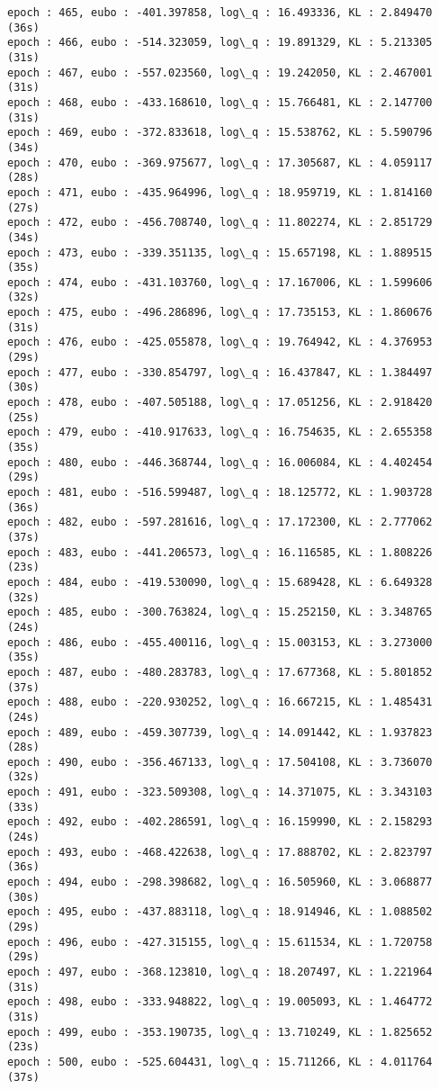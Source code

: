 \documentclass[11pt]{article}
\begin{document}
\begin{Verbatim}[commandchars=\\\{\}]
epoch : 465, eubo : -401.397858, log\_q : 16.493336, KL : 2.849470 (36s)
epoch : 466, eubo : -514.323059, log\_q : 19.891329, KL : 5.213305 (31s)
epoch : 467, eubo : -557.023560, log\_q : 19.242050, KL : 2.467001 (31s)
epoch : 468, eubo : -433.168610, log\_q : 15.766481, KL : 2.147700 (31s)
epoch : 469, eubo : -372.833618, log\_q : 15.538762, KL : 5.590796 (34s)
epoch : 470, eubo : -369.975677, log\_q : 17.305687, KL : 4.059117 (28s)
epoch : 471, eubo : -435.964996, log\_q : 18.959719, KL : 1.814160 (27s)
epoch : 472, eubo : -456.708740, log\_q : 11.802274, KL : 2.851729 (34s)
epoch : 473, eubo : -339.351135, log\_q : 15.657198, KL : 1.889515 (35s)
epoch : 474, eubo : -431.103760, log\_q : 17.167006, KL : 1.599606 (32s)
epoch : 475, eubo : -496.286896, log\_q : 17.735153, KL : 1.860676 (31s)
epoch : 476, eubo : -425.055878, log\_q : 19.764942, KL : 4.376953 (29s)
epoch : 477, eubo : -330.854797, log\_q : 16.437847, KL : 1.384497 (30s)
epoch : 478, eubo : -407.505188, log\_q : 17.051256, KL : 2.918420 (25s)
epoch : 479, eubo : -410.917633, log\_q : 16.754635, KL : 2.655358 (35s)
epoch : 480, eubo : -446.368744, log\_q : 16.006084, KL : 4.402454 (29s)
epoch : 481, eubo : -516.599487, log\_q : 18.125772, KL : 1.903728 (36s)
epoch : 482, eubo : -597.281616, log\_q : 17.172300, KL : 2.777062 (37s)
epoch : 483, eubo : -441.206573, log\_q : 16.116585, KL : 1.808226 (23s)
epoch : 484, eubo : -419.530090, log\_q : 15.689428, KL : 6.649328 (32s)
epoch : 485, eubo : -300.763824, log\_q : 15.252150, KL : 3.348765 (24s)
epoch : 486, eubo : -455.400116, log\_q : 15.003153, KL : 3.273000 (35s)
epoch : 487, eubo : -480.283783, log\_q : 17.677368, KL : 5.801852 (37s)
epoch : 488, eubo : -220.930252, log\_q : 16.667215, KL : 1.485431 (24s)
epoch : 489, eubo : -459.307739, log\_q : 14.091442, KL : 1.937823 (28s)
epoch : 490, eubo : -356.467133, log\_q : 17.504108, KL : 3.736070 (32s)
epoch : 491, eubo : -323.509308, log\_q : 14.371075, KL : 3.343103 (33s)
epoch : 492, eubo : -402.286591, log\_q : 16.159990, KL : 2.158293 (24s)
epoch : 493, eubo : -468.422638, log\_q : 17.888702, KL : 2.823797 (36s)
epoch : 494, eubo : -298.398682, log\_q : 16.505960, KL : 3.068877 (30s)
epoch : 495, eubo : -437.883118, log\_q : 18.914946, KL : 1.088502 (29s)
epoch : 496, eubo : -427.315155, log\_q : 15.611534, KL : 1.720758 (29s)
epoch : 497, eubo : -368.123810, log\_q : 18.207497, KL : 1.221964 (31s)
epoch : 498, eubo : -333.948822, log\_q : 19.005093, KL : 1.464772 (31s)
epoch : 499, eubo : -353.190735, log\_q : 13.710249, KL : 1.825652 (23s)
epoch : 500, eubo : -525.604431, log\_q : 15.711266, KL : 4.011764 (37s)

\end{Verbatim}
\end{document}
